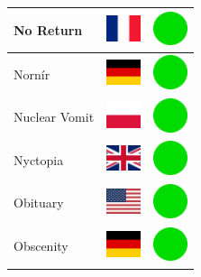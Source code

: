\documentclass[12pt, a4paper, twoside]{report}
\begin{document}
\begin{center}
\begin{longtable}{|p{5cm}|p{2cm}|p{2cm}|}
 No Return                                                  & \includegraphics[width=1cm]{../img/flags/fr} &   \includegraphics[width=1cm]{../likes/y} \\ \hline
 Nornír                                                     & \includegraphics[width=1cm]{../img/flags/de} &   \includegraphics[width=1cm]{../likes/y} \\ \hline
 Nuclear Vomit                                              & \includegraphics[width=1cm]{../img/flags/pl} &   \includegraphics[width=1cm]{../likes/y} \\ \hline
 Nyctopia                                                   & \includegraphics[width=1cm]{../img/flags/gb} &   \includegraphics[width=1cm]{../likes/y} \\ \hline
 Obituary                                                   & \includegraphics[width=1cm]{../img/flags/us} &   \includegraphics[width=1cm]{../likes/y} \\ \hline
 Obscenity                                                  & \includegraphics[width=1cm]{../img/flags/de} &   \includegraphics[width=1cm]{../likes/y} \\ \hline

\end{longtable}
\end{center}
\end{document}
